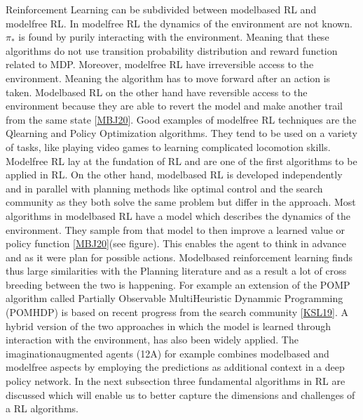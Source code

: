 \documentclass[letterpaper,10pt,english]{jupyterBook}
\begin{document}
\sphinxAtStartPar
Reinforcement Learning can be subdivided between model\sphinxhyphen{}based RL and model\sphinxhyphen{}free RL. In model\sphinxhyphen{}free RL the dynamics of the environment are not known. \(\pi_*\) is found by purily interacting with the environment. Meaning that these algorithms do not use transition probability distribution and reward function related to MDP. Moreover, model\sphinxhyphen{}free RL have irreversible access to the environment. Meaning the algorithm has to move forward after an action is taken. Model\sphinxhyphen{}based RL on the other hand have reversible access to the environment because they are able to revert the model and make another trail from the same state {[}\hyperlink{cite.Financial_application:id24}{MBJ20}{]}. Good examples of model\sphinxhyphen{}free RL techniques are the Q\sphinxhyphen{}learning and Policy Optimization algorithms. They tend to be used on a variety of tasks, like playing video games to learning complicated locomotion skills. Model\sphinxhyphen{}free RL lay at the fundation of RL and are one of the first algorithms to be applied in RL. On the other hand, model\sphinxhyphen{}based RL is developed independently and in parallel with planning methods like optimal control and the search community as they both solve the same problem but differ in the approach. Most algorithms in model\sphinxhyphen{}based RL have a model which describes the dynamics of the environment. They sample from that model to then improve a learned value or policy function {[}\hyperlink{cite.Financial_application:id24}{MBJ20}{]}(see figure). This enables the agent to think in advance and as it were plan for possible actions. Model\sphinxhyphen{}based reinforcement learning finds thus large similarities with the Planning literature and as a result a lot of cross breeding between the two is happening. For example an extension of the POMP algorithm called Partially Observable Multi\sphinxhyphen{}Heuristic Dynammic Programming (POMHDP) is based on recent progress from the search community {[}\hyperlink{cite.Financial_application:id27}{KSL19}{]}. A hybrid version of the two approaches in which the model is learned through interaction with the environment, has also been widely applied. The imagination\sphinxhyphen{}augmented agents (12A) for example combines model\sphinxhyphen{}based and model\sphinxhyphen{}free aspects by employing the predictions as additional context in a deep policy network.  In the next subsection three fundamental algorithms in RL are discussed which will enable us to better capture the dimensions and challenges of a RL algorithms.
\end{document}
